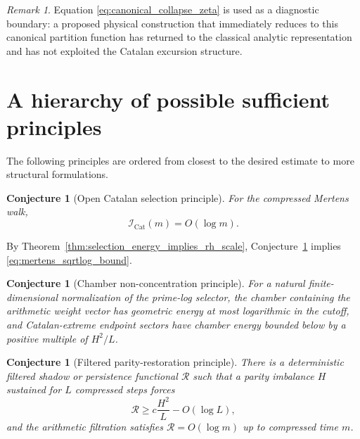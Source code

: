 \documentclass[11pt]{amsart}
\numberwithin{equation}{section}
\theoremstyle{plain}
\newtheorem{conjecture}[theorem]{Conjecture}
\theoremstyle{definition}
\theoremstyle{remark}
\newtheorem{remark}[theorem]{Remark}
\newcommand{\Icat}{\mathcal{I}_{\mathrm{Cat}}}
\begin{document}
\begin{remark}
\label{rem:zeta_role}
Equation \eqref{eq:canonical_collapse_zeta} is used as a diagnostic boundary: a proposed physical construction that immediately reduces to this canonical partition function has returned to the classical analytic representation and has not exploited the Catalan excursion structure.
\end{remark}

\section{A hierarchy of possible sufficient principles}
\label{sec:sufficient_principles}

The following principles are ordered from closest to the desired estimate to more structural formulations.

\begin{conjecture}[Open Catalan selection principle]
\label{conj:open_catalan_selection}
For the compressed Mertens walk,
\begin{equation}
\Icat(m)=O(\log m).
\label{eq:open_catalan_selection_conjecture}
\end{equation}
\end{conjecture}

By Theorem~\ref{thm:selection_energy_implies_rh_scale}, Conjecture~\ref{conj:open_catalan_selection} implies \eqref{eq:mertens_sqrtlog_bound}.

\begin{conjecture}[Chamber non-concentration principle]
\label{conj:chamber_nonconcentration}
For a natural finite-dimensional normalization of the prime-log selector, the chamber containing the arithmetic weight vector has geometric energy at most logarithmic in the cutoff, and Catalan-extreme endpoint sectors have chamber energy bounded below by a positive multiple of $H^2/L$.
\end{conjecture}

\begin{conjecture}[Filtered parity-restoration principle]
\label{conj:filtered_parity_restoration}
There is a deterministic filtered shadow or persistence functional $\mathcal R$ such that a parity imbalance $H$ sustained for $L$ compressed steps forces
\begin{equation}
\mathcal R
\ge
c\frac{H^2}{L}-O(\log L),
\label{eq:parity_restoration_energy}
\end{equation}
and the arithmetic filtration satisfies $\mathcal R=O(\log m)$ up to compressed time $m$.
\end{conjecture}
\end{document}
